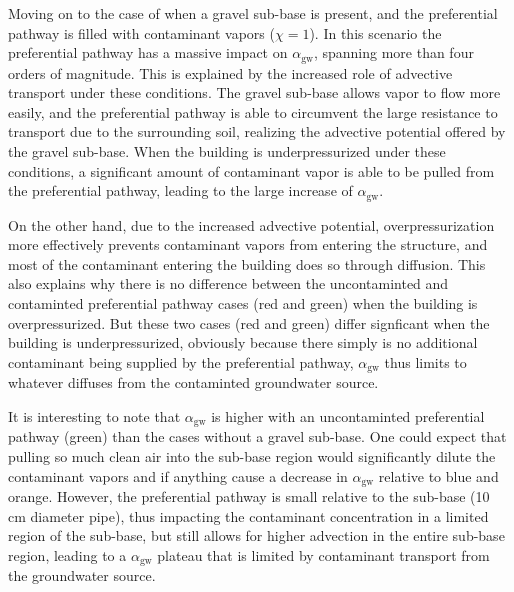 \documentclass[journal=esthag,manuscript=article]{achemso}
\begin{document}
Moving on to the case of when a gravel sub-base is present, and the preferential pathway is filled with contaminant vapors ($\chi=1$).
In this scenario the preferential pathway has a massive impact on $\alpha_\mathrm{gw}$, spanning more than four orders of magnitude.
This is explained by the increased role of advective transport under these conditions.
The gravel sub-base allows vapor to flow more easily, and the preferential pathway is able to circumvent the large resistance to transport due to the surrounding soil, realizing the advective potential offered by the gravel sub-base.
When the building is underpressurized under these conditions, a significant amount of contaminant vapor is able to be pulled from the preferential pathway, leading to the large increase of $\alpha_\mathrm{gw}$.\par

On the other hand, due to the increased advective potential, overpressurization more effectively prevents contaminant vapors from entering the structure, and most of the contaminant entering the building does so through diffusion.
This also explains why there is no difference between the uncontaminted and contaminted preferential pathway cases (red and green) when the building is overpressurized.
But these two cases (red and green) differ signficant when the building is underpressurized, obviously because there simply is no additional contaminant being supplied by the preferential pathway, $\alpha_\mathrm{gw}$ thus limits to whatever diffuses from the contaminted groundwater source.\par

It is interesting to note that $\alpha_\mathrm{gw}$ is higher with an uncontaminted preferential pathway (green) than the cases without a gravel sub-base.
One could expect that pulling so much clean air into the sub-base region would significantly dilute the contaminant vapors and if anything cause a decrease in $\alpha_\mathrm{gw}$ relative to blue and orange.
However, the preferential pathway is small relative to the sub-base (10 cm diameter pipe), thus impacting the contaminant concentration in a limited region of the sub-base, but still allows for higher advection in the entire sub-base region, leading to a $\alpha_\mathrm{gw}$ plateau that is limited by contaminant transport from the groundwater source.\par
\end{document}
